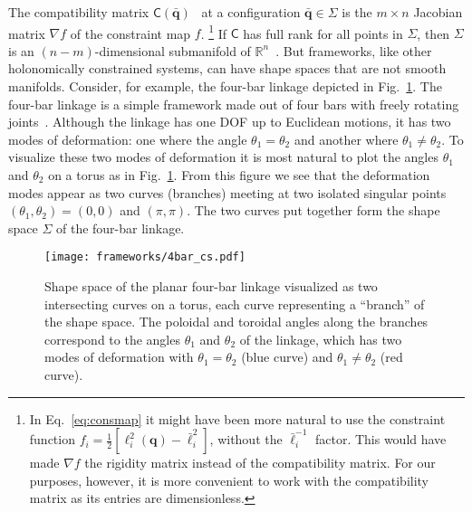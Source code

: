 The compatibility matrix $\mathsf{C}(\bar{\bm{q}})$~\cite{pellegrino1986,lubensky2015} at a configuration $\bar{\bm{q}} \in \Sigma$ is the $m \times n$ Jacobian matrix $\nabla f$ of the constraint map $f$.%
\footnote{In Eq.~\eqref{eq:consmap} it might have been more natural to use the constraint function $f_{i} = \tfrac{1}{2}[\ell_{i}^{2}(\bm{q}) - \bar{\ell}_{i}^{2}]$, without the $\bar{\ell}_{i}^{-1}$ factor.  This would have made $\nabla f$ the rigidity matrix instead of the compatibility matrix.  For our purposes, however, it is more convenient to work with the compatibility matrix as its entries are dimensionless.}
If $\mathsf{C}$ has full rank for all points in $\Sigma$, then $\Sigma$ is an $(n - m)$-dimensional submanifold of $\mathbb{R}^{n}$~\cite{leimkuhler2005,lee2013}.
But frameworks, like other holonomically constrained systems, can have shape spaces that are not smooth manifolds.
Consider, for example, the four-bar linkage depicted in Fig.~\ref{fig:4bar_cs}.
The four-bar linkage is a simple framework made out of four bars with freely rotating joints~\cite{grashof1883,hartenberg1964,shimamoto2005}.
Although the linkage has one DOF up to Euclidean motions,
it has two modes of deformation: one where the angle $\theta_1 = \theta_2$ and another where $\theta_1 \ne \theta_2$.
To visualize these two modes of deformation it is most natural to plot the angles $\theta_{1}$ and $\theta_{2}$ on a torus as in Fig.~\ref{fig:4bar_cs}.
From this figure we see that the deformation modes appear as two curves (branches) meeting at two isolated singular points $(\theta_1,\theta_2) = (0,0)$ and $(\pi,\pi)$.
The two curves put together form the shape space $\Sigma$ of the four-bar linkage.
%
\begin{figure}
  \begin{center}
    \texttt{[image: frameworks/4bar\_cs.pdf]}
  \end{center}
  \caption{Shape space of the planar four-bar linkage visualized as two intersecting curves on a torus, each curve representing a ``branch'' of the shape space.
    The poloidal and toroidal angles along the branches correspond to the angles $\theta_1$ and $\theta_2$ of the linkage, which has two modes of deformation with $\theta_{1} = \theta_{2}$ (blue curve) and $\theta_{1} \ne \theta_{2}$ (red curve).}
  \label{fig:4bar_cs}
\end{figure}
\label{page:4bar}

